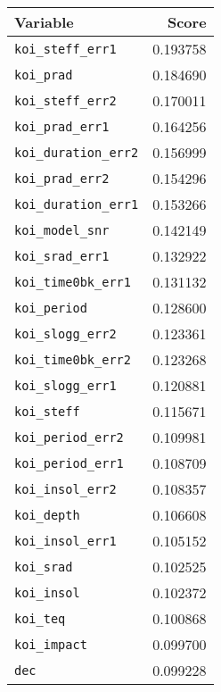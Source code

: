 \begin{tabular}{lr}
\toprule
                     Variable &     Score \\
\midrule
    \texttt{koi\_steff\_err1} &  0.193758 \\
           \texttt{koi\_prad} &  0.184690 \\
    \texttt{koi\_steff\_err2} &  0.170011 \\
     \texttt{koi\_prad\_err1} &  0.164256 \\
 \texttt{koi\_duration\_err2} &  0.156999 \\
     \texttt{koi\_prad\_err2} &  0.154296 \\
 \texttt{koi\_duration\_err1} &  0.153266 \\
     \texttt{koi\_model\_snr} &  0.142149 \\
     \texttt{koi\_srad\_err1} &  0.132922 \\
  \texttt{koi\_time0bk\_err1} &  0.131132 \\
         \texttt{koi\_period} &  0.128600 \\
    \texttt{koi\_slogg\_err2} &  0.123361 \\
  \texttt{koi\_time0bk\_err2} &  0.123268 \\
    \texttt{koi\_slogg\_err1} &  0.120881 \\
          \texttt{koi\_steff} &  0.115671 \\
   \texttt{koi\_period\_err2} &  0.109981 \\
   \texttt{koi\_period\_err1} &  0.108709 \\
    \texttt{koi\_insol\_err2} &  0.108357 \\
          \texttt{koi\_depth} &  0.106608 \\
    \texttt{koi\_insol\_err1} &  0.105152 \\
           \texttt{koi\_srad} &  0.102525 \\
          \texttt{koi\_insol} &  0.102372 \\
            \texttt{koi\_teq} &  0.100868 \\
         \texttt{koi\_impact} &  0.099700 \\
                 \texttt{dec} &  0.099228 \\
\bottomrule
\end{tabular}
